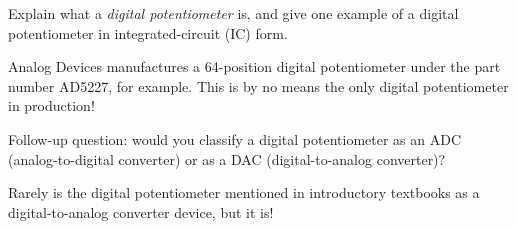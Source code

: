

Explain what a {\it digital potentiometer} is, and give one example of a digital potentiometer in integrated-circuit (IC) form.







Analog Devices manufactures a 64-position digital potentiometer under the part number AD5227, for example.  This is by no means the only digital potentiometer in production!

\vskip 10pt

Follow-up question: would you classify a digital potentiometer as an ADC (analog-to-digital converter) or as a DAC (digital-to-analog converter)?







Rarely is the digital potentiometer mentioned in introductory textbooks as a digital-to-analog converter device, but it is!




